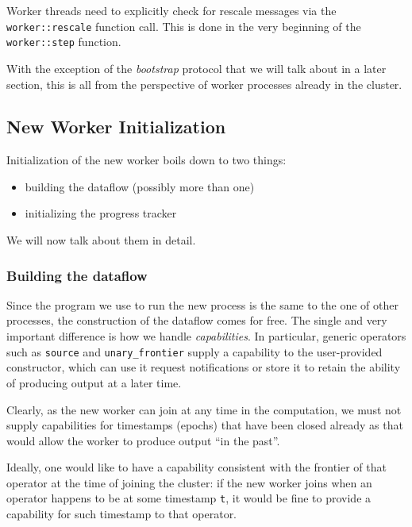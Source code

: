 \documentclass[12pt]{extarticle}
\begin{document}
Worker threads need to explicitly check for rescale messages via the \verb|worker::rescale| function call.
This is done in the very beginning of the \verb|worker::step| function.

With the exception of the \textit{bootstrap} protocol that we will talk about in a later section,
this is all from the perspective of worker processes already in the cluster.

\subsection{New Worker Initialization}

Initialization of the new worker boils down to two things:
\begin{itemize}
    \item building the dataflow (possibly more than one)
    \item initializing the progress tracker
\end{itemize}

We will now talk about them in detail.

\subsubsection{Building the dataflow}
Since the program we use to run the new process is the same to the one of other processes,
the construction of the dataflow comes for free.
The single and very important difference is how we handle \textit{capabilities}.
In particular, generic operators such as \verb|source| and \verb|unary_frontier| supply
a capability to the user-provided constructor, which can use it request notifications
or store it to retain the ability of producing output at a later time.

Clearly, as the new worker can join at any time in the computation, we must not supply
capabilities for timestamps (epochs) that have been closed already as that would allow
the worker to produce output ``in the past''.

Ideally, one would like to have a capability consistent with the frontier
of that operator at the time of joining the cluster: if the new worker joins when
an operator happens to be at some timestamp \verb|t|, it would be fine to provide
a capability for such timestamp to that operator.

\end{document}
